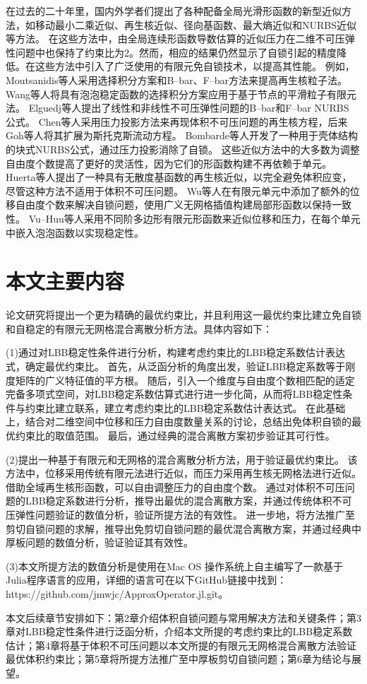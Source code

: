 在过去的二十年里，国内外学者们提出了各种配备全局光滑形函数的新型近似方法，如移动最小二乘近似\cite{Belytschko1994}、再生核近似\cite{liu1995}、径向基函数\cite{chi2014,wang2020d}、最大熵近似\cite{ortiz-bernardin2015}和NURBS近似\cite{hughes2005,auricchio2010}等方法。
在这些方法中，由全局连续形函数导数估算的近似压力在二维不可压弹性问题中也保持了约束比为2。然而，相应的结果仍然显示了自锁引起的精度降低\cite{Huerta2001}。在这些方法中引入了广泛使用的有限元免自锁技术，以提高其性能。
例如，Moutsanidis等人采用选择积分方案和B--bar、F--bar方法来提高再生核粒子法\cite{moutsanidis2020,moutsanidis2021}。Wang等人将具有泡泡稳定函数的选择积分方案应用于基于节点的平滑粒子有限元法\cite{wang2022c}。
Elguedj等人提出了线性和非线性不可压弹性问题的B--bar和F--bar NURBS 公式\cite{elguedj2008}。
Chen等人采用压力投影方法来再现体积不可压问题的再生核方程\cite{chen2000}，后来Goh等人将其扩展为斯托克斯流动方程\cite{goh2018}。
Bombarde等人开发了一种用于壳体结构的块式NURBS公式，通过压力投影消除了自锁\cite{bombarde2022}。
这些近似方法中的大多数为调整自由度个数提高了更好的灵活性，因为它们的形函数构建不再依赖于单元。
Huerta等人提出了一种具有无散度基函数的再生核近似，以完全避免体积应变\cite{huerta2004a}，尽管这种方法不适用于体积不可压问题。
Wu等人在有限元单元中添加了额外的位移自由度个数来解决自锁问题，使用广义无网格插值构建局部形函数以保持一致性\cite{wu2012}。
Vu--Huu等人采用不同阶多边形有限元形函数来近似位移和压力，在每个单元中嵌入泡泡函数以实现稳定性\cite{vu-huu2019}。
\section{本文主要内容}
论文研究将提出一个更为精确的最优约束比，并且利用这一最优约束比建立免自锁和自稳定的有限元无网格混合离散分析方法。具体内容如下：

(1)通过对LBB稳定性条件进行分析，构建考虑约束比的LBB稳定系数估计表达式，确定最优约束比。
首先，从泛函分析的角度出发，验证LBB稳定系数等于刚度矩阵的广义特征值的平方根。
随后，引入一个维度与自由度个数相匹配的适定完备多项式空间，对LBB稳定系数估算式进行进一步化简，从而将LBB稳定性条件与约束比建立联系，建立考虑约束比的LBB稳定系数估计表达式。
在此基础上，结合对二维空间中位移和压力自由度数量关系的讨论，总结出免体积自锁的最优约束比的取值范围。
最后，通过经典的混合离散方案初步验证其可行性。

(2)提出一种基于有限元和无网格的混合离散分析方法，用于验证最优约束比。
该方法中，位移采用传统有限元法进行近似，而压力采用再生核无网格法进行近似。借助全域再生核形函数，可以自由调整压力的自由度个数。
通过对体积不可压问题的LBB稳定系数进行分析，推导出最优的混合离散方案，并通过传统体积不可压弹性问题验证的数值分析，验证所提方法的有效性。
进一步地，将方法推广至剪切自锁问题的求解，推导出免剪切自锁问题的最优混合离散方案，并通过经典中厚板问题的数值分析，验证验证其有效性。

(3)本文所提方法的数值分析是使用在Mac OS 操作系统上自主编写了一款基于Julia程序语言的应用，详细的语言可在以下GitHub链接中找到：https://github.com/jmwjc/ApproxOperator.jl.git。

本文后续章节安排如下：第2章介绍体积自锁问题与常用解决方法和关键条件；第3章对LBB稳定性条件进行泛函分析，介绍本文所提的考虑约束比的LBB稳定系数估计；第4章将基于体积不可压问题以本文所提的有限元无网格混合离散方法验证最优体积约束比；第5章将所提方法推广至中厚板剪切自锁问题；第6章为结论与展望。